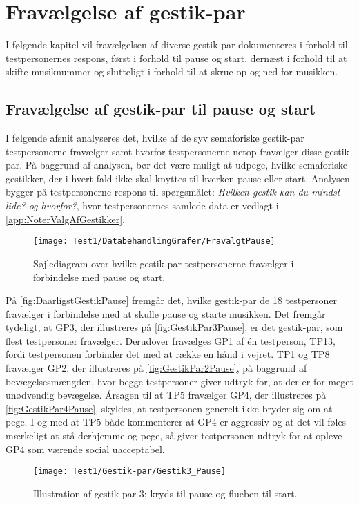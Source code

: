 \chapter{Fravælgelse af gestik-par}
\label{app:TestresultaterFravaelgelse}
%
I følgende kapitel vil fravælgelsen af diverse gestik-par dokumenteres i forhold til testpersonernes respons, først i forhold til pause og start, dernæst i forhold til at skifte musiknummer og slutteligt i forhold til at skrue op og ned for musikken. 
%
\section{Fravælgelse af gestik-par til pause og start}
\label{app:TestresultaterPauseDaarlig} 
%
I følgende afsnit analyseres det, hvilke af de syv semaforiske gestik-par testpersonerne fravælger samt hvorfor testpersonerne netop fravælger disse gestik-par. På baggrund af analysen, bør det være muligt at udpege, hvilke semaforiske gestikker, der i hvert fald ikke skal knyttes til hverken pause eller start. Analysen bygger på testpersonerne respons til spørgsmålet: \textit{Hvilken gestik kan du mindst lide? og hvorfor?}, hvor testpersonernes samlede data er vedlagt i \autoref{app:NoterValgAfGestikker}.
%
\begin{figure}[H]
	\centering
	\texttt{[image: Test1/DatabehandlingGrafer/FravalgtPause]}
	\caption{Søjlediagram over hvilke gestik-par testpersonerne fravælger i forbindelse med pause og start.}
	\label{fig:DaarligstGestikPause}
\end{figure}
\noindent
% 
På \autoref{fig:DaarligstGestikPause} fremgår det, hvilke gestik-par de 18 testpersoner fravælger i forbindelse med at skulle pause og starte musikken. Det fremgår tydeligt, at GP3, der illustreres på \autoref{fig:GestikPar3Pause}, er det gestik-par, som flest testpersoner fravælger. Derudover fravælges GP1 af én testperson, TP13, fordi testpersonen forbinder det med at række en hånd i vejret. TP1 og TP8 fravælger GP2, der illustreres på \autoref{fig:GestikPar2Pause}, på baggrund af bevægelsesmængden, hvor begge testpersoner giver udtryk for, at der er for meget unødvendig bevægelse. Årsagen til at TP5 fravælger GP4, der illustreres på \autoref{fig:GestikPar4Pause}, skyldes, at testpersonen generelt ikke bryder sig om at pege. I og med at TP5 både kommenterer at GP4 er aggressiv og at det vil føles mærkeligt at stå derhjemme og pege, så giver testpersonen udtryk for at opleve GP4 som værende social uacceptabel. 
%
\begin{figure}[H]
	\centering
	\texttt{[image: Test1/Gestik-par/Gestik3\_Pause]}
	\caption{Illustration af gestik-par 3; kryds til pause og flueben til start.}
	\label{fig:GestikPar3Pause}
\end{figure}
